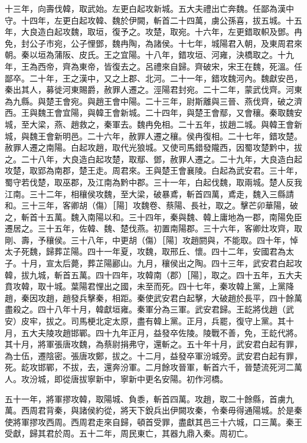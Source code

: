\begin{pinyinscope}
十三年，向壽伐韓，取武始。左更白起攻新城。五大夫禮出亡奔魏。任鄙為漢中守。十四年，左更白起攻韓、魏於伊闕，斬首二十四萬，虜公孫喜，拔五城。十五年，大良造白起攻魏，取垣，復予之。攻楚，取宛。十六年，左更錯取軹及鄧。冉免，封公子市宛，公子悝鄧，魏冉陶，為諸侯。十七年，城陽君入朝，及東周君來朝。秦以垣為蒲阪、皮氏。王之宜陽。十八年，錯攻垣、河雍，決橋取之。十九年，王為西帝，齊為東帝，皆復去之。呂禮來自歸。齊破宋，宋王在魏，死溫。任鄙卒。二十年，王之漢中，又之上郡、北河。二十一年，錯攻魏河內。魏獻安邑，秦出其人，募徙河東賜爵，赦罪人遷之。涇陽君封宛。二十二年，蒙武伐齊。河東為九縣。與楚王會宛。與趙王會中陽。二十三年，尉斯離與三晉、燕伐齊，破之濟西。王與魏王會宜陽，與韓王會新城。二十四年，與楚王會鄢，又會穰。秦取魏安城，至大梁，燕、趙救之，秦軍去。魏冉免相。二十五年，拔趙二城。與韓王會新城，與魏王會新明邑。二十六年，赦罪人遷之穰。侯冉復相。二十七年，錯攻楚。赦罪人遷之南陽。白起攻趙，取代光狼城。又使司馬錯發隴西，因蜀攻楚黔中，拔之。二十八年，大良造白起攻楚，取鄢、鄧，赦罪人遷之。二十九年，大良造白起攻楚，取郢為南郡，楚王走。周君來。王與楚王會襄陵。白起為武安君。三十年，蜀守若伐楚，取巫郡，及江南為黔中郡。三十一年，白起伐魏，取兩城。楚人反我江南。三十二年，相穰侯攻魏，至大梁，破暴鳶，斬首四萬，鳶走，魏入三縣請和。三十三年，客卿胡（傷）［陽］攻魏卷、蔡陽、長社，取之。擊芒卯華陽，破之，斬首十五萬。魏入南陽以和。三十四年，秦與魏、韓上庸地為一郡，南陽免臣遷居之。三十五年，佐韓、魏、楚伐燕。初置南陽郡。三十六年，客卿灶攻齊，取剛、壽，予穰侯。三十八年，中更胡（傷）［陽］攻趙閼與，不能取。四十年，悼太子死魏，歸葬芷陽。四十一年夏，攻魏，取邢丘、懷。四十二年，安國君為太子。十月，宣太后薨，葬芷陽酈山。九月，穰侯出之陶。四十三年，武安君白起攻韓，拔九城，斬首五萬。四十四年，攻韓南（郡）［陽］，取之。四十五年，五大夫賁攻韓，取十城。葉陽君悝出之國，未至而死。四十七年，秦攻韓上黨，上黨降趙，秦因攻趙，趙發兵擊秦，相距。秦使武安君白起擊，大破趙於長平，四十餘萬盡殺之。四十八年十月，韓獻垣雍。秦軍分為三軍。武安君歸。王龁將伐趙（武安）皮牢，拔之。司馬梗北定太原，盡有韓上黨。正月，兵罷，復守上黨。其十月，五大夫陵攻趙邯鄲。四十九年正月，益發卒佐陵。陵戰不善，免，王龁代將。其十月，將軍張唐攻魏，為蔡尉捐弗守，還斬之。五十年十月，武安君白起有罪，為士伍，遷陰密。張唐攻鄭，拔之。十二月，益發卒軍汾城旁。武安君白起有罪，死。龁攻邯鄲，不拔，去，還奔汾軍。二月餘攻晉軍，斬首六千，晉楚流死河二萬人。攻汾城，即從唐拔寧新中，寧新中更名安陽。初作河橋。

五十一年，將軍摎攻韓，取陽城、負黍，斬首四萬。攻趙，取二十餘縣，首虜九萬。西周君背秦，與諸侯約從，將天下銳兵出伊闕攻秦，令秦毋得通陽城。於是秦使將軍摎攻西周。西周君走來自歸，頓首受罪，盡獻其邑三十六城，口三萬。秦王受獻，歸其君於周。五十二年，周民東亡，其器九鼎入秦。周初亡。


\end{pinyinscope}
